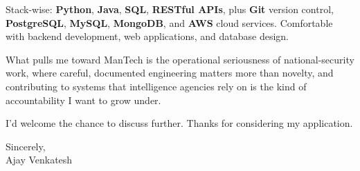 \documentclass[letterpaper,11pt]{article}
\begin{document}
Stack-wise: \textbf{Python}, \textbf{Java}, \textbf{SQL}, \textbf{RESTful APIs}, plus \textbf{Git} version control, \textbf{PostgreSQL}, \textbf{MySQL}, \textbf{MongoDB}, and \textbf{AWS} cloud services. Comfortable with backend development, web applications, and database design.

What pulls me toward ManTech is the operational seriousness of national-security work, where careful, documented engineering matters more than novelty, and contributing to systems that intelligence agencies rely on is the kind of accountability I want to grow under.

I'd welcome the chance to discuss further. Thanks for considering my application.

\vspace{12pt}
Sincerely, \\
Ajay Venkatesh
\end{document}
